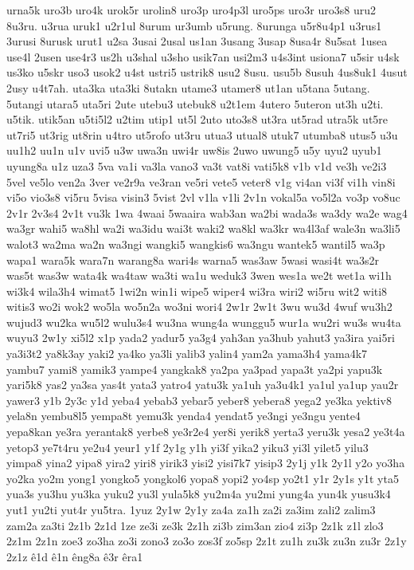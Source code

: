 {urna5k uro3b uro4k urok5r urolin8 uro3p uro4p3l uro5ps uro3r uro3s8 uru2
8u3ru. u3rua uruk1 u2r1ul 8urum ur3umb u5rung. 8urunga u5r8u4p1 u3rus1
3urusi 8urusk urut1 u2sa 3usai 2usal us1an 3usang 3usap 8usa4r 8u5sat
1usea use4l 2usen use4r3 us2h u3shal u3sho usik7an usi2m3 u4s3int usiona7
u5sir u4sk us3ko u5skr uso3 usok2 u4st ustri5 ustrik8 usu2 8usu. usu5b
8usuh 4us8uk1 4usut 2usy u4t7ah. uta3ka uta3ki 8utakn utame3 utamer8 ut1an
u5tana 5utang. 5utangi utara5 uta5ri 2ute utebu3 utebuk8 u2t1em 4utero
5uteron ut3h u2ti. u5tik. utik5an u5ti5l2 u2tim utip1 ut5l 2uto uto3s8
ut3ra ut5rad utra5k ut5re ut7ri5 ut3rig ut8rin u4tro ut5rofo ut3ru utua3
utual8 utuk7 utumba8 utus5 u3u uu1h2 uu1n u1v uvi5 u3w uwa3n uwi4r uw8is
2uwo uwung5 u5y uyu2 uyub1 uyung8a u1z uza3 5va va1i va3la vano3 va3t
vat8i vati5k8 v1b v1d ve3h ve2i3 5vel ve5lo ven2a 3ver ve2r9a ve3ran ve5ri
vete5 veter8 v1g vi4an vi3f vi1h vin8i vi5o vio3s8 vi5ru 5visa visin3
5vist 2vl v1la v1li 2v1n vokal5a vo5l2a vo3p vo8uc 2v1r 2v3s4 2v1t vu3k
1wa 4waai 5waaira wab3an wa2bi wada3s wa3dy wa2e wag4 wa3gr wahi5 wa8hl
wa2i wa3idu wai3t waki2 wa8kl wa3kr wa4l3af wale3n wa3li5 walot3 wa2ma
wa2n wa3ngi wangki5 wangkis6 wa3ngu wantek5 wantil5 wa3p wapa1 wara5k
wara7n warang8a wari4s warna5 was3aw 5wasi wasi4t wa3s2r was5t was3w
wata4k wa4taw wa3ti wa1u weduk3 3wen wes1a we2t wet1a wi1h wi3k4 wila3h4
wimat5 1wi2n win1i wipe5 wiper4 wi3ra wiri2 wi5ru wit2 witi8 witis3 wo2i
wok2 wo5la wo5n2a wo3ni wori4 2w1r 2w1t 3wu wu3d 4wuf wu3h2 wujud3 wu2ka
wu5l2 wulu3s4 wu3na wung4a wunggu5 wur1a wu2ri wu3s wu4ta wuyu3 2w1y xi5l2
x1p yada2 yadur5 ya3g4 yah3an ya3hub yahut3 ya3ira yai5ri ya3i3t2 ya8k3ay
yaki2 ya4ko ya3li yalib3 yalin4 yam2a yama3h4 yama4k7 yambu7 yami8 yamik3
yampe4 yangkak8 ya2pa ya3pad yapa3t ya2pi yapu3k yari5k8 yas2 ya3sa yas4t
yata3 yatro4 yatu3k ya1uh ya3u4k1 ya1ul ya1up yau2r yawer3 y1b 2y3c y1d
yeba4 yebab3 yebar5 yeber8 yebera8 yega2 ye3ka yektiv8 yela8n yembu8l5
yempa8t yemu3k yenda4 yendat5 ye3ngi ye3ngu yente4 yepa8kan ye3ra
yerantak8 yerbe8 ye3r2e4 yer8i yerik8 yerta3 yeru3k yesa2 ye3t4a yetop3
ye7t4ru ye2u4 yeur1 y1f 2y1g y1h yi3f yika2 yiku3 yi3l yilet5 yilu3 yimpa8
yina2 yipa8 yira2 yiri8 yirik3 yisi2 yisi7k7 yisip3 2y1j y1k 2y1l y2o
yo3ha yo2ka yo2m yong1 yongko5 yongkol6 yopa8 yopi2 yo4sp yo2t1 y1r 2y1s
y1t yta5 yua3s yu3hu yu3ka yuku2 yu3l yula5k8 yu2m4a yu2mi yung4a yun4k
yusu3k4 yut1 yu2ti yut4r yu5tra. 1yuz 2y1w 2y1y za4a za1h za2i za3im zali2
zalim3 zam2a za3ti 2z1b 2z1d 1ze ze3i ze3k 2z1h zi3b zim3an zio4 zi3p 2z1k
z1l zlo3 2z1m 2z1n zoe3 zo3ha zo3i zono3 zo3o zos3f zo5sp 2z1t zu1h zu3k
zu3n zu3r 2z1y 2z1z ê1d ê1n êng8a ê3r êra1
}%

